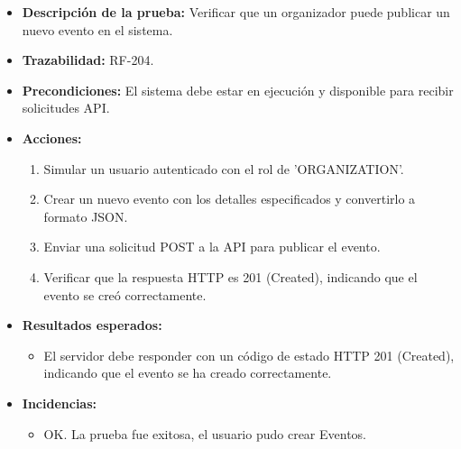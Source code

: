 \begin{itemize}
    \item \textbf{Descripción de la prueba:} Verificar que un organizador puede publicar un nuevo evento en el sistema.
    \item \textbf{Trazabilidad:} RF-204.
    \item \textbf{Precondiciones:} El sistema debe estar en ejecución y disponible para recibir solicitudes API.
    \item \textbf{Acciones:}
    \begin{enumerate}
        \item Simular un usuario autenticado con el rol de 'ORGANIZATION'.
        \item Crear un nuevo evento con los detalles especificados y convertirlo a formato JSON.
        \item Enviar una solicitud POST a la API para publicar el evento.
        \item Verificar que la respuesta HTTP es 201 (Created), indicando que el evento se creó correctamente.
    \end{enumerate}
    \item \textbf{Resultados esperados:}
    \begin{itemize}
        \item El servidor debe responder con un código de estado HTTP 201 (Created), indicando que el evento se ha creado correctamente.
    \end{itemize}
    \item \textbf{Incidencias:}
    \begin{itemize}
        \item OK. La prueba fue exitosa, el usuario pudo crear Eventos.
    \end{itemize}
\end{itemize}

